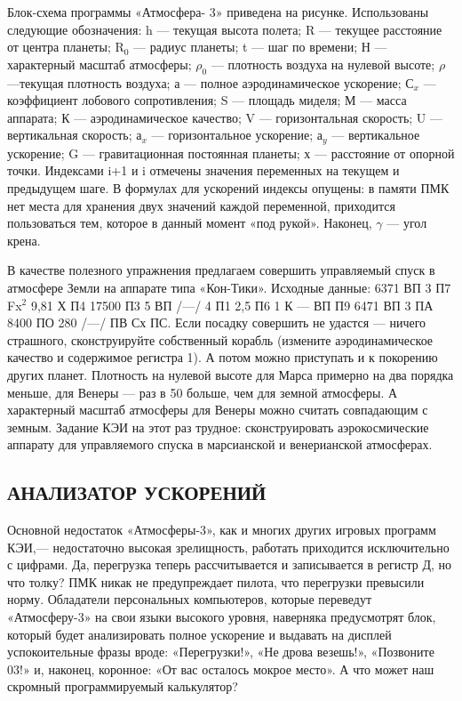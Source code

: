 \documentclass[11pt,a4paper,oneside]{article}
\begin{document}
Блок-схема программы «Атмосфера- 3» приведена на рисунке. Использованы следующие обозначения: h — текущая высота полета; R — текущее расстояние от центра планеты; R$_{0}$ — радиус планеты; t — шаг по времени; Н — характерный масштаб атмосферы; $\rho_{0}$ — плотность воздуха на нулевой высоте; $\rho$—текущая плотность воздуха; а — полное аэродинамическое ускорение; С$_{x}$ — коэффициент лобового сопротивления; S — площадь миделя; М — масса аппарата; К — аэродинамическое качество; V — горизонтальная скорость; U — вертикальная скорость; а$_{x}$ — горизонтальное ускорение; а$_{y}$ — вертикальное ускорение; G — гравитационная постоянная планеты; х — расстояние от опорной точки. Индексами i+1 и i отмечены значения переменных на текущем и предыдущем шаге. В формулах для ускорений индексы опущены: в памяти ПМК нет места для хранения двух значений каждой переменной, приходится пользоваться тем, которое в данный момент «под рукой». Наконец, $\gamma$ — угол крена.

В качестве полезного упражнения предлагаем совершить управляемый спуск в атмосфере Земли на аппарате типа «Кон-Тики». Исходные данные: 6371 ВП 3 П7 Fx$^{2}$ 9,81 Х П4 17500 П3 5 ВП /—/ 4 П1 2,5 П6 1 К — ВП П9 6471 ВП 3 ПА 8400 ПО 280 /—/ ПВ Сх ПС. Если посадку совершить не удастся — ничего страшного, сконструируйте собственный корабль (измените аэродинамическое качество и содержимое регистра 1). А потом можно приступать и к покорению других планет. Плотность на нулевой высоте для Марса примерно на два порядка меньше, для Венеры — раз в 50 больше, чем для земной атмосферы. А характерный масштаб атмосферы для Венеры можно считать совпадающим с земным. Задание КЭИ на этот раз трудное: сконструировать аэрокосмические аппарату для управляемого спуска в марсианской и венерианской атмосферах.

\subsection{АНАЛИЗАТОР УСКОРЕНИЙ}
Основной недостаток «Атмосферы-3», как и многих других игровых программ КЭИ,— недостаточно высокая зрелищность, работать приходится исключительно с цифрами. Да, перегрузка теперь рассчитывается и записывается в регистр Д, но что толку? ПМК никак не предупреждает пилота, что перегрузки превысили норму. Обладатели персональных компьютеров, которые переведут «Атмосферу-3» на свои языки высокого уровня, наверняка предусмотрят блок, который будет анализировать полное ускорение и выдавать на дисплей успокоительные фразы вроде: «Перегрузки!», «Не дрова везешь!», «Позвоните 03!» и, наконец, коронное: «От вас осталось мокрое место». А что может наш скромный программируемый калькулятор?
\end{document}

